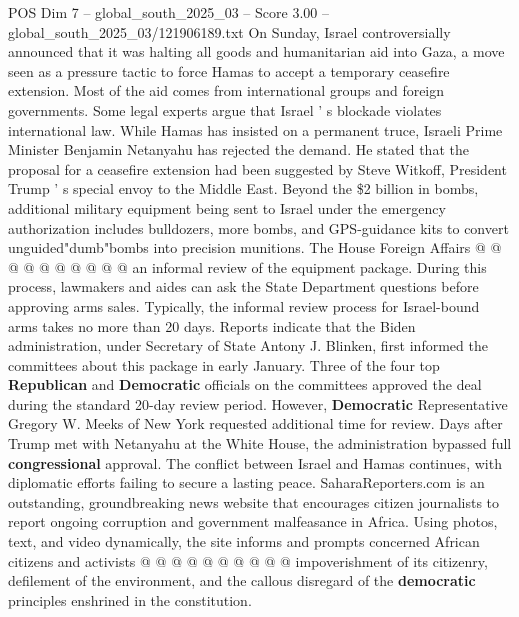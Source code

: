 \begin{textsample}{POS Dim 7 – global\_south\_2025\_03 – Score 3.00 – global\_south\_2025\_03/121906189.txt}
On Sunday, Israel controversially announced that it was halting all goods and humanitarian aid into Gaza, a move seen as a pressure tactic to force Hamas to accept a temporary ceasefire extension.
Most of the aid comes from international groups and foreign governments.
Some legal experts argue that Israel ' s blockade violates international law.
While Hamas has insisted on a permanent truce, Israeli Prime Minister Benjamin Netanyahu has rejected the demand.
He stated that the proposal for a ceasefire extension had been suggested by Steve Witkoff, President Trump ' s special envoy to the Middle East.
Beyond the \$2 billion in bombs, additional military equipment being sent to Israel under the emergency authorization includes bulldozers, more bombs, and GPS-guidance kits to convert unguided"dumb"bombs into precision munitions.
The House Foreign Affairs @ @ @ @ @ @ @ @ @ @ an informal review of the equipment package.
During this process, lawmakers and aides can ask the State Department questions before approving arms sales.
Typically, the informal review process for Israel-bound arms takes no more than 20 days.
Reports indicate that the Biden administration, under Secretary of State Antony J.
Blinken, first informed the committees about this package in early January.
Three of the four top \textbf{Republican} and \textbf{Democratic} officials on the committees approved the deal during the standard 20-day review period.
However, \textbf{Democratic} Representative Gregory W.
Meeks of New York requested additional time for review.
Days after Trump met with Netanyahu at the White House, the administration bypassed full \textbf{congressional} approval.
The conflict between Israel and Hamas continues, with diplomatic efforts failing to secure a lasting peace.
SaharaReporters.com is an outstanding, groundbreaking news website that encourages citizen journalists to report ongoing corruption and government malfeasance in Africa.
Using photos, text, and video dynamically, the site informs and prompts concerned African citizens and activists @ @ @ @ @ @ @ @ @ @ impoverishment of its citizenry, defilement of the environment, and the callous disregard of the \textbf{democratic} principles enshrined in the constitution.

\end{textsample}
